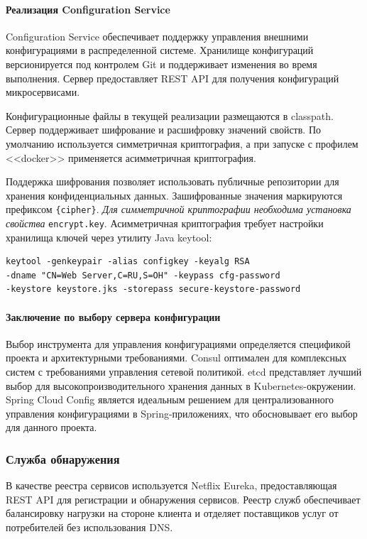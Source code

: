 \paragraph{Реализация Configuration Service}

Configuration Service обеспечивает поддержку управления внешними конфигурациями в распределенной системе. Хранилище конфигураций версионируется под контролем Git и поддерживает изменения во время выполнения.
Сервер предоставляет REST API для получения конфигураций микросервисами.

Конфигурационные файлы в текущей реализации размещаются в classpath.
Сервер поддерживает шифрование и расшифровку значений свойств. По умолчанию используется симметричная криптография, а при запуске с профилем <<docker>> применяется асимметричная криптография.

Поддержка шифрования позволяет использовать публичные репозитории для хранения конфиденциальных данных.
Зашифрованные значения маркируются префиксом \texttt{\{cipher\}}. \textit{Для симметричной криптографии необходима установка свойства} \texttt{encrypt.key}.
Асимметричная криптография требует настройки хранилища ключей через утилиту Java keytool:

\begin{verbatim}
keytool -genkeypair -alias configkey -keyalg RSA
-dname "CN=Web Server,C=RU,S=OH" -keypass cfg-password
-keystore keystore.jks -storepass secure-keystore-password
\end{verbatim}

\paragraph{Заключение по выбору сервера конфигурации}

Выбор инструмента для управления конфигурациями определяется спецификой проекта и архитектурными требованиями. Consul оптимален для комплексных систем с требованиями управления сетевой политикой. etcd представляет лучший выбор для высокопроизводительного хранения данных в Kubernetes-окружении. Spring Cloud Config является идеальным решением для централизованного управления конфигурациями в Spring-приложениях, что обосновывает его выбор для данного проекта.

\subsubsection{Служба обнаружения}

В качестве реестра сервисов используется Netflix Eureka, предоставляющая REST API для регистрации и обнаружения сервисов.
Реестр служб обеспечивает балансировку нагрузки на стороне клиента и отделяет поставщиков услуг от потребителей без использования DNS.


